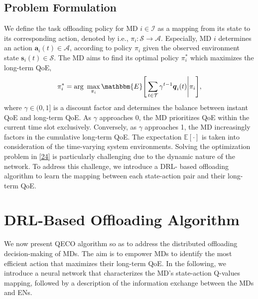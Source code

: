 \documentclass[10pt, journal,letterpaper]{IEEEtran}
\begin{document}
\subsection{Problem Formulation}
We define the task offloading policy for MD $i \in \mathcal{I}$ as a mapping from its state to its corresponding action, denoted by i.e., $\pi_i : \mathcal{S} \rightarrow \mathcal{A}$. Especially, MD $i$ determines an action $\boldsymbol{a}_i(t) \in \mathcal{A}$, according to policy $\pi_i$ given the observed environment state $\boldsymbol{s}_i(t) \in \mathcal{S}$. The MD aims to find its optimal policy $\pi_i^*$ which maximizes the long-term QoE,
\begin{alignat}{1}
	\pi_i^* = \text{arg}\,\,  \max\limits_{\pi_i}  \mathbbm{E} \Bigg[ \sum\limits_{t \in \mathcal{T}}  \gamma^{t-1}\boldsymbol{q}_i(t) \Bigg| \pi_i \Bigg],
	\label{24}  
\end{alignat}
where $\gamma \in (0,1]$ is a discount factor and determines the balance between instant QoE and long-term QoE. As $\gamma$ approaches 0, the MD prioritizes QoE within the current time slot exclusively. Conversely, as $\gamma$ approaches 1, the MD increasingly factors in the cumulative long-term QoE. The expectation $\mathbb{E}[\cdot]$ is taken into consideration of the time-varying system environments. Solving the optimization problem in \eqref{24} is particularly challenging due to the dynamic nature of the network. To address this challenge, we introduce a DRL- based offloading algorithm to learn the mapping between each state-action pair and their long-term QoE.
\section{DRL-Based Offloading Algorithm} \label{section:V}
We now present QECO algorithm so as to address the distributed offloading decision-making of MDs. The aim is to empower MDs to identify the most efficient action that maximizes their long-term QoE. In the following, we introduce a neural network that characterizes the MD's state-action Q-values mapping, followed by a description of the information exchange between the MDs and ENs.
\end{document}
